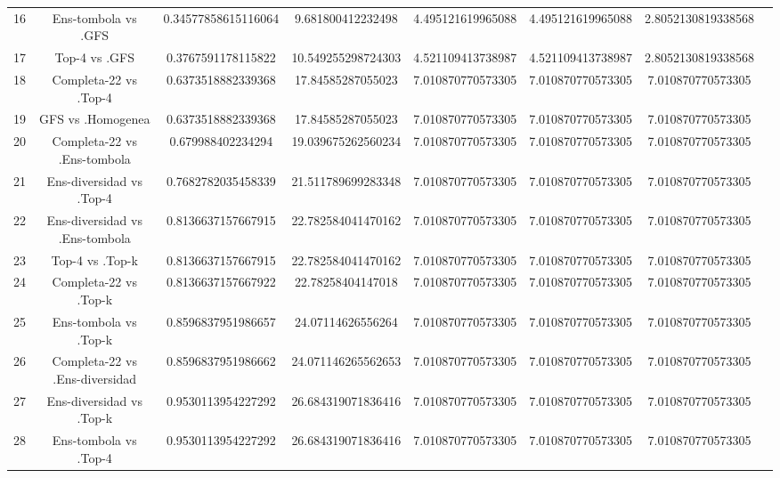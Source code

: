 \documentclass[a4paper,10pt]{article}
\begin{document}
\begin{landscape}
\begin{table}[!htp]
\begin{tabular}{cccccccc}
16&Ens-tombola vs .GFS&0.34577858615116064&9.681800412232498&4.495121619965088&4.495121619965088&2.8052130819338568\\
17&Top-4 vs .GFS&0.3767591178115822&10.549255298724303&4.521109413738987&4.521109413738987&2.8052130819338568\\
18&Completa-22 vs .Top-4&0.6373518882339368&17.84585287055023&7.010870770573305&7.010870770573305&7.010870770573305\\
19&GFS vs .Homogenea&0.6373518882339368&17.84585287055023&7.010870770573305&7.010870770573305&7.010870770573305\\
20&Completa-22 vs .Ens-tombola&0.679988402234294&19.039675262560234&7.010870770573305&7.010870770573305&7.010870770573305\\
21&Ens-diversidad vs .Top-4&0.7682782035458339&21.511789699283348&7.010870770573305&7.010870770573305&7.010870770573305\\
22&Ens-diversidad vs .Ens-tombola&0.8136637157667915&22.782584041470162&7.010870770573305&7.010870770573305&7.010870770573305\\
23&Top-4 vs .Top-k&0.8136637157667915&22.782584041470162&7.010870770573305&7.010870770573305&7.010870770573305\\
24&Completa-22 vs .Top-k&0.8136637157667922&22.78258404147018&7.010870770573305&7.010870770573305&7.010870770573305\\
25&Ens-tombola vs .Top-k&0.8596837951986657&24.07114626556264&7.010870770573305&7.010870770573305&7.010870770573305\\
26&Completa-22 vs .Ens-diversidad&0.8596837951986662&24.071146265562653&7.010870770573305&7.010870770573305&7.010870770573305\\
27&Ens-diversidad vs .Top-k&0.9530113954227292&26.684319071836416&7.010870770573305&7.010870770573305&7.010870770573305\\
28&Ens-tombola vs .Top-4&0.9530113954227292&26.684319071836416&7.010870770573305&7.010870770573305&7.010870770573305\\
\hline
\end{tabular}
\end{table}

\end{landscape}
\end{document}
